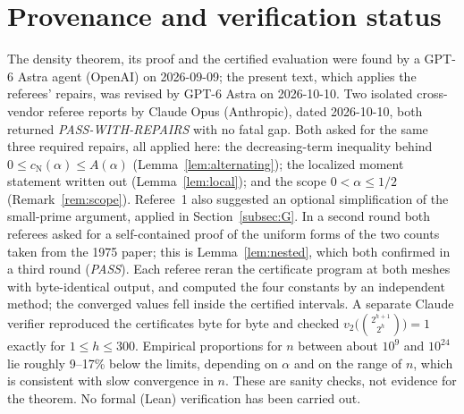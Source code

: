 \documentclass[10pt]{article}
\theoremstyle{remark}
\newcommand{\cn}{c_{\mathrm N}}
\begin{document}
\section*{Provenance and verification status}
The density theorem, its proof and the certified evaluation were found by
a GPT-6 Astra agent (OpenAI) on 2026-09-09; the present text, which applies
the referees' repairs, was revised by GPT-6 Astra on 2026-10-10. Two
isolated cross-vendor referee reports by Claude Opus (Anthropic), dated
2026-10-10, both returned \emph{PASS-WITH-REPAIRS} with no fatal gap.
Both asked for the same three required repairs, all applied here:
the decreasing-term inequality behind $0\leq\cn(\alpha)\leq A(\alpha)$
(Lemma~\ref{lem:alternating}); the localized moment statement written out
(Lemma~\ref{lem:local}); and the scope $0<\alpha\leq1/2$
(Remark~\ref{rem:scope}). Referee~1 also suggested an optional
simplification of the small-prime argument, applied in
Section~\ref{subsec:G}. In a second round both referees asked for a
self-contained proof of the uniform forms of the two counts taken from
the 1975 paper; this is Lemma~\ref{lem:nested}, which both confirmed in a
third round (\emph{PASS}). Each referee reran the certificate program at
both meshes with byte-identical output, and computed the four constants
by an independent method; the converged values fell inside the certified
intervals. A separate Claude verifier reproduced the certificates byte
for byte and checked $v_2\bigl(\binom{2^{h+1}}{2^h}\bigr)=1$ exactly for
$1\leq h\leq300$. Empirical proportions for $n$ between about $10^{9}$
and $10^{24}$ lie roughly 9--17\% below the limits, depending on $\alpha$
and on the range of $n$, which is consistent with slow convergence in
$n$. These are sanity checks, not evidence for the theorem.
No formal (Lean) verification has been carried out.
\end{document}
